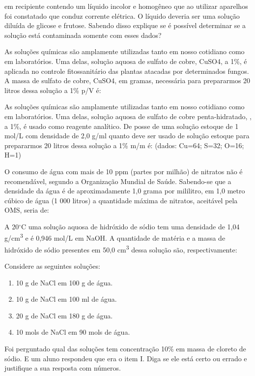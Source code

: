 \documentclass[a4paper,12]{exam}
\begin{document}
\begin{multicols}{2}
  	\begin{questions}
	  \question em recipiente contendo um líquido incolor e homogêneo que ao utilizar aparelhos foi constatado que conduz corrente elétrica. O líquido deveria ser uma solução diluída de glicose e frutose. Sabendo disso explique se é possível determinar se a solução está contaminada somente com esses dados? 
	  \fillwithlines{8em}
	  
	  \question As soluções químicas são amplamente utilizadas tanto em nosso cotidiano como em
	  laboratórios. Uma delas, solução aquosa de sulfato de cobre, CuSO4, a 1\%, é aplicada no controle
	  fitossanitário das plantas atacadas por determinados fungos. A massa de sulfato de cobre,
	  CuSO4, em gramas, necessária para prepararmos 20 litros dessa solução a 1\% p/V é:
	  \makeemptybox{2cm}
	  
	  \question As soluções químicas são amplamente utilizadas tanto em nosso cotidiano como em
laboratórios. Uma delas, solução aquosa de sulfato de cobre penta-hidratado, , a 1\%, é usado como reagente analítico. De posse de uma solução estoque de 1 mol/L com densidade de 2,0 g/ml quanto deve ser usado de solução estoque para prepararmos 20 litros dessa solução a 1\% m/m é: (dados: Cu=64; S=32; O=16; H=1)
	  \makeemptybox{2cm}

	\question O consumo de água com mais de 10 ppm (partes por milhão) de nitratos
não é recomendável, segundo a Organização Mundial de Saúde. Sabendo-se que a densidade da
água é de aproximadamente 1,0 grama por mililitro, em 1,0 metro cúbico de água (1 000 litros)
a quantidade máxima de nitratos, aceitável pela OMS, seria de:
	
	\question A 20$^{\circ}$C uma solução aquosa de hidróxido de sódio tem uma densidade de 1,04 \si{g/cm^3} e
é 0,946 mol/L em NaOH. A quantidade de matéria e a massa de hidróxido de sódio presentes em 50,0 \si{cm^3}
dessa solução são, respectivamente:\makeemptybox{2cm}
	
	\question Considere as seguintes soluções:
	\begin{enumerate}[label=\Roman*-]
		\item 10 g de NaCl em 100 g de água.
		\item 10 g de NaCl em 100 ml de água.
		\item 20 g de NaCl em 180 g de água.
		\item 10 mols de NaCl em 90 mols de água.
	\end{enumerate}
	Foi perguntado qual das soluções tem concentração 10\% em massa de cloreto de sódio. E um aluno respondeu que era o item I. Diga se ele está certo ou errado e justifique a sua resposta com números. \makeemptybox{2cm}
	
	
	 \end{questions}
\end{multicols}
\end{document}
